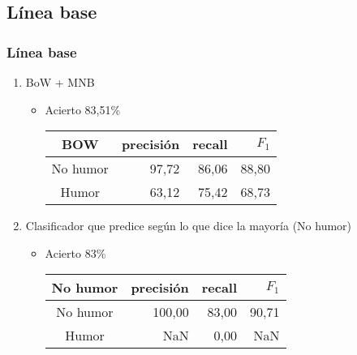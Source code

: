 \subsection{Línea base}
\begin{frame}
    \frametitle{Línea base}

    \begin{enumerate}[<+->]
        \item BoW + MNB

        \begin{itemize}
            \item Acierto 83,51\%

            \begin{center}
                \begin{tabular}{ c | r | r | r }
                    \textbf{BOW} & precisión & recall & {\color{blue} $F_1$} \\
                    \hline
                    No humor & 97,72 & 86,06 & 88,80 \\
                    \hline
                    Humor & 63,12 & 75,42 & 68,73 \\
                \end{tabular}
            \end{center}
        \end{itemize}

        \item Clasificador que predice según lo que dice la mayoría (No humor)

        \begin{itemize}
            \item {\color{blue} Acierto} 83\%

            \begin{center}
                \begin{tabular}{ c | r | r | r }
                    \textbf{No humor} & precisión & recall & $F_1$ \\
                    \hline
                    No humor & 100,00 & 83,00 & 90,71 \\
                    \hline
                    Humor & NaN & 0,00 & NaN \\
                \end{tabular}
            \end{center}
        \end{itemize}
    \end{enumerate}
\end{frame}

